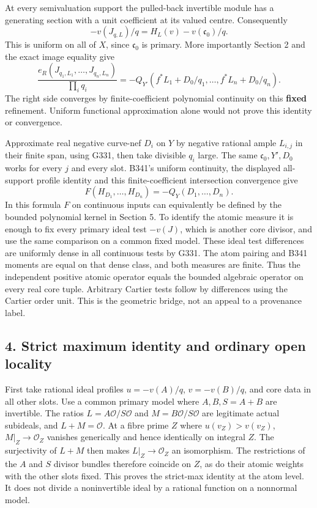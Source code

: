 \documentclass[
]{article}
\begin{document}
At every semivaluation support the pulled-back invertible module has a
generating section with a unit coefficient at its valued centre.
Consequently \[-v(J_{q,L})/q=H_L(v)-v(\mathfrak c_0)/q.\] This is
uniform on all of \(X\), since \(\mathfrak c_0\) is primary. More
importantly Section 2 and the exact image equality give
\[\frac{e_R(J_{q_1,L_1},\ldots,J_{q_n,L_n})}{\prod_iq_i}
=-Q_{Y'}(f^*L_1+D_0/q_1,\ldots,f^*L_n+D_0/q_n).\] The right side
converges by finite-coefficient polynomial continuity on this
\textbf{fixed} refinement. Uniform functional approximation alone would
not prove this identity or convergence.

Approximate real negative curve-nef \(D_i\) on \(Y\) by negative
rational ample \(L_{i,j}\) in their finite span, using G331, then take
divisible \(q_i\) large. The same \(\mathfrak c_0,Y',D_0\) works for
every \(j\) and every slot. B341's uniform continuity, the displayed
all-support profile identity and this finite-coefficient intersection
convergence give \[F(H_{D_1},\ldots,H_{D_n})=-Q_Y(D_1,\ldots,D_n).\] In
this formula \(F\) on continuous inputs can equivalently be defined by
the bounded polynomial kernel in Section 5. To identify the atomic
measure it is enough to fix every primary ideal test \(-v(J)\), which is
another core divisor, and use the same comparison on a common fixed
model. These ideal test differences are uniformly dense in all
continuous tests by G331. The atom pairing and B341 moments are equal on
that dense class, and both measures are finite. Thus the independent
positive atomic operator equals the bounded algebraic operator on every
real core tuple. Arbitrary Cartier tests follow by differences using the
Cartier order unit. This is the geometric bridge, not an appeal to a
provenance label.

\subsection{4. Strict maximum identity and ordinary open
locality}\label{strict-maximum-identity-and-ordinary-open-locality}

First take rational ideal profiles \(u=-v(A)/q\), \(v=-v(B)/q\), and
core data in all other slots. Use a common primary model where
\(A,B,S=A+B\) are invertible. The ratios \(L=A\mathcal O/S\mathcal O\)
and \(M=B\mathcal O/S\mathcal O\) are legitimate actual subideals, and
\(L+M=\mathcal O\). At a fibre prime \(Z\) where \(u(v_Z)>v(v_Z)\),
\(M|_Z\to\mathcal O_Z\) vanishes generically and hence identically on
integral \(Z\). The surjectivity of \(L+M\) then makes
\(L|_Z\to\mathcal O_Z\) an isomorphism. The restrictions of the \(A\)
and \(S\) divisor bundles therefore coincide on \(Z\), as do their
atomic weights with the other slots fixed. This proves the strict-max
identity at the atom level. It does not divide a noninvertible ideal by
a rational function on a nonnormal model.
\end{document}
